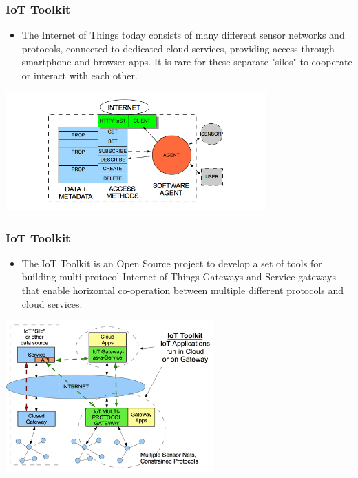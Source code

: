\documentclass{beamer}
\begin{document}
\begin{frame}
	\frametitle{IoT Toolkit}
	\vspace{.1cm}
	\begin{itemize}
		\item The Internet of Things today consists of many different sensor networks and protocols, connected to dedicated cloud services, providing access through smartphone and browser apps. It is rare for these separate "silos" to cooperate or interact with each other.	
	\end{itemize}
	\vspace{.5cm}
	\hspace*{2cm} \includegraphics[width=10cm]{figs/iot-toolkit-2.jpg}
\end{frame}

\begin{frame}
	\frametitle{IoT Toolkit}
	\begin{itemize}
		\item The IoT Toolkit is an Open Source project to develop a set of tools for building multi-protocol Internet of Things Gateways and Service gateways that enable horizontal co-operation between multiple different protocols and cloud services.
	\end{itemize}
	\vspace{.1cm}
	\hspace*{3cm} \includegraphics[width=8cm]{figs/iot-toolkit-1.png}
\end{frame}
\end{document}
